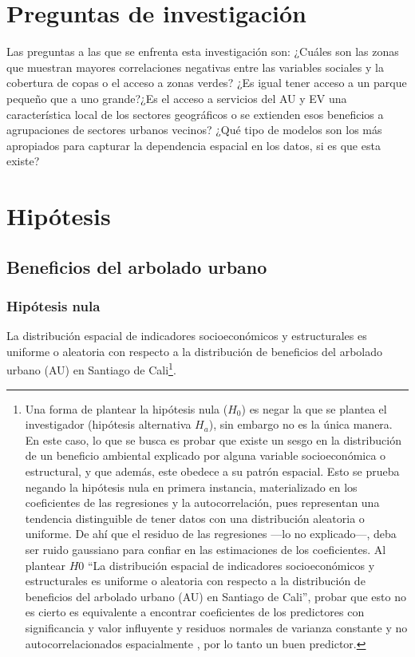 \documentclass[12pt,a4paper,openany]{book}
\let\rmarkdownfootnote\footnote%
\def\footnote{\protect\rmarkdownfootnote}
\theoremstyle{definition}
\theoremstyle{definition}
\theoremstyle{definition}
\theoremstyle{remark}
\begin{document}
\section{Preguntas de investigación}\label{preguntas-de-investigacion}

Las preguntas a las que se enfrenta esta investigación son: ¿Cuáles son
las zonas que muestran mayores correlaciones negativas entre las
variables sociales y la cobertura de copas o el acceso a zonas verdes?
¿Es igual tener acceso a un parque pequeño que a uno grande?¿Es el
acceso a servicios del AU y EV una característica local de los sectores
geográficos o se extienden esos beneficios a agrupaciones de sectores
urbanos vecinos? ¿Qué tipo de modelos son los más apropiados para
capturar la dependencia espacial en los datos, si es que esta existe?

\section{Hipótesis}\label{hipotesis}

\subsection{Beneficios del arbolado
urbano}\label{beneficios-del-arbolado-urbano}

\subsubsection{Hipótesis nula}\label{hipotesis-nula}

La distribución espacial de indicadores socioeconómicos y estructurales
es uniforme o aleatoria con respecto a la distribución de beneficios del
arbolado urbano (AU) en Santiago de Cali\footnote{Una forma de plantear
  la hipótesis nula (\(H_0\)) es negar la que se plantea el investigador
  (hipótesis alternativa \(H_a\)), sin embargo no es la única manera. En
  este caso, lo que se busca es probar que existe un sesgo en la
  distribución de un beneficio ambiental explicado por alguna variable
  socioeconómica o estructural, y que además, este obedece a su patrón
  espacial. Esto se prueba negando la hipótesis nula en primera
  instancia, materializado en los coeficientes de las regresiones y la
  autocorrelación, pues representan una tendencia distinguible de tener
  datos con una distribución aleatoria o uniforme. De ahí que el residuo
  de las regresiones ---lo no explicado---, deba ser ruido gaussiano
  para confiar en las estimaciones de los coeficientes. Al plantear
  \(H0\) ``La distribución espacial de indicadores socioeconómicos y
  estructurales es uniforme o aleatoria con respecto a la distribución
  de beneficios del arbolado urbano (AU) en Santiago de Cali'', probar
  que esto no es cierto es equivalente a encontrar coeficientes de los
  predictores con significancia y valor influyente y residuos normales
  de varianza constante y no autocorrelacionados espacialmente , por lo
  tanto un buen predictor.}.
\end{document}
